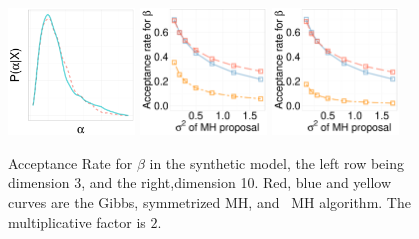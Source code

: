   \begin{figure}[H]
  \centering
  \begin{minipage}[!hp]{0.99\linewidth}
    \includegraphics [width=0.3\textwidth, angle=0]{figs/EXP_ks/exp_hist_44_05_10_.pdf}
	\hspace{.5in}
    \includegraphics [width=0.30\textwidth, angle=0]{figs/acc/EXP_D3beta_k2.pdf}
    \includegraphics [width=0.30\textwidth, angle=0]{figs/acc/EXP_D10beta_k2.pdf}
  \end{minipage}
    \caption{Acceptance Rate for $\beta$ in the synthetic model, the left row being dimension 3, and the right,dimension 10.  Red, blue and yellow curves are the Gibbs, symmetrized MH,
 and \naive\ MH  algorithm. The multiplicative factor is $2$. }
     \label{fig:ACC_EXP}
  \end{figure}
